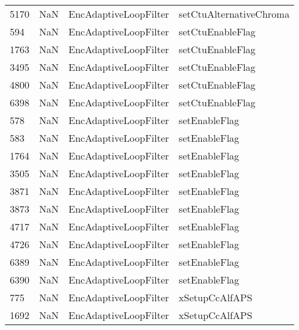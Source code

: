 \begin{tabular}{llll}
5170 &                   NaN &      EncAdaptiveLoopFilter &                   setCtuAlternativeChroma \\
594  &                   NaN &      EncAdaptiveLoopFilter &                          setCtuEnableFlag \\
1763 &                   NaN &      EncAdaptiveLoopFilter &                          setCtuEnableFlag \\
3495 &                   NaN &      EncAdaptiveLoopFilter &                          setCtuEnableFlag \\
4800 &                   NaN &      EncAdaptiveLoopFilter &                          setCtuEnableFlag \\
6398 &                   NaN &      EncAdaptiveLoopFilter &                          setCtuEnableFlag \\
578  &                   NaN &      EncAdaptiveLoopFilter &                             setEnableFlag \\
583  &                   NaN &      EncAdaptiveLoopFilter &                             setEnableFlag \\
1764 &                   NaN &      EncAdaptiveLoopFilter &                             setEnableFlag \\
3505 &                   NaN &      EncAdaptiveLoopFilter &                             setEnableFlag \\
3871 &                   NaN &      EncAdaptiveLoopFilter &                             setEnableFlag \\
3873 &                   NaN &      EncAdaptiveLoopFilter &                             setEnableFlag \\
4717 &                   NaN &      EncAdaptiveLoopFilter &                             setEnableFlag \\
4726 &                   NaN &      EncAdaptiveLoopFilter &                             setEnableFlag \\
6389 &                   NaN &      EncAdaptiveLoopFilter &                             setEnableFlag \\
6390 &                   NaN &      EncAdaptiveLoopFilter &                             setEnableFlag \\
775  &                   NaN &      EncAdaptiveLoopFilter &                            xSetupCcAlfAPS \\
1692 &                   NaN &      EncAdaptiveLoopFilter &                            xSetupCcAlfAPS \\

\end{tabular}

